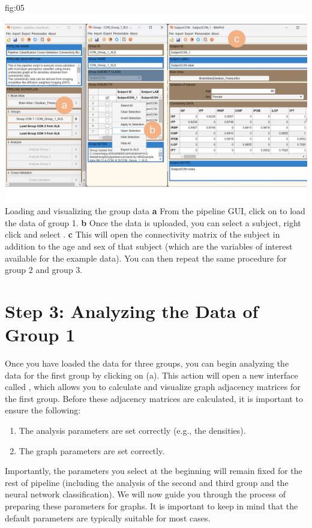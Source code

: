 \documentclass[justified]{tufte-handout}
\begin{document}
{
	{fig:05}
	{
	\includegraphics{fig05.jpg}
	}
	{Loading and visualizing the group data}
	{
	{\bf a} From the pipeline GUI, click on  to load the data of group 1.
	{\bf b} Once the data is uploaded, you can select a subject, right click and select .
	{\bf c} This will open the connectivity matrix of the subject in addition to the age and sex of that subject (which are the variables of interest available for the example data).
	You can then repeat the same procedure for group 2 and group 3.
	}

\clearpage
\section{Step 3: Analyzing the Data of Group 1}

Once you have loaded the data for three groups, you can begin analyzing the data for the first group by clicking on  (a). 
This action will open a new interface called , which allows you to calculate and visualize graph adjacency matrices for the first group. 
Before these adjacency matrices are calculated, it is important to ensure the following: 
\begin{enumerate}
	\item The analysis parameters are set correctly (e.g., the densities).
	\item The graph parameters are set correctly.
\end{enumerate}

Importantly, the parameters you select at the beginning will remain fixed for the rest of pipeline (including the analysis of the second and third group and the neural network classification). We will now guide you through the process of preparing these parameters for graphs. It is important to keep in mind that the default parameters are typically suitable for most cases.

}
\end{document}
